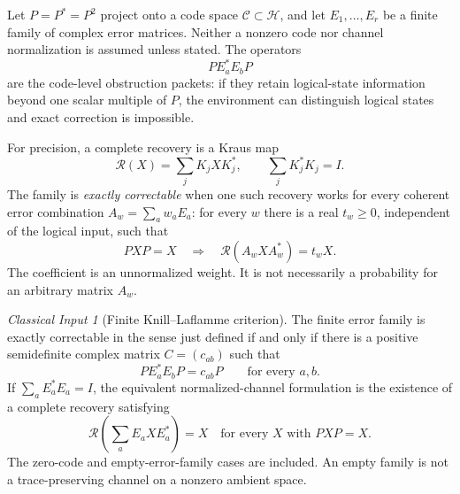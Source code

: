 \documentclass[11pt]{article}
\theoremstyle{definition}
\theoremstyle{remark}
\newtheorem{classical}[theorem]{Classical Input}
\newcommand{\cC}{\mathcal C}
\newcommand{\cH}{\mathcal H}
\newcommand{\cR}{\mathcal R}
\begin{document}
Let $P=P^*=P^2$ project onto a code space $\cC\subset\cH$, and let $E_1,\ldots,E_r$ be a finite family of complex error matrices. Neither a nonzero code nor channel normalization is assumed unless stated. The operators
\[
P E_a^*E_bP
\]
are the code-level obstruction packets: if they retain logical-state information beyond one scalar multiple of $P$, the environment can distinguish logical states and exact correction is impossible.

For precision, a complete recovery is a Kraus map
\[
\cR(X)=\sum_jK_jXK_j^*,\qquad \sum_jK_j^*K_j=I.
\]
The family is \emph{exactly correctable} when one such recovery works for every coherent error combination $A_w=\sum_aw_aE_a$: for every $w$ there is a real $t_w\ge0$, independent of the logical input, such that
\[
PXP=X\quad\Longrightarrow\quad
\cR(A_wXA_w^*)=t_wX.
\]
The coefficient is an unnormalized weight. It is not necessarily a probability for an arbitrary matrix $A_w$.

\begin{classical}[Finite Knill--Laflamme criterion]\label{thm:kl}
The finite error family is exactly correctable in the sense just defined if and only if there is a positive semidefinite complex matrix $C=(c_{ab})$ such that
\[
\boxed{PE_a^*E_bP=c_{ab}P\qquad\text{for every }a,b.}
\]
If $\sum_aE_a^*E_a=I$, the equivalent normalized-channel formulation is the existence of a complete recovery satisfying
\[
\cR\!\left(\sum_aE_aXE_a^*\right)=X
\quad\text{for every }X\text{ with }PXP=X.
\]
The zero-code and empty-error-family cases are included. An empty family is not a trace-preserving channel on a nonzero ambient space.
\end{classical}
\end{document}
